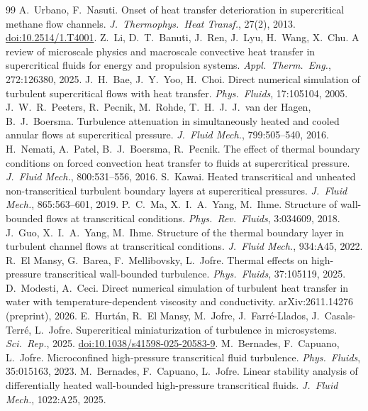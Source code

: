 \documentclass[11pt]{article}
\begin{document}
\begin{thebibliography}{99}
 A.\ Urbano, F.\ Nasuti. Onset of heat transfer deterioration in supercritical methane flow channels. \emph{J.\ Thermophys.\ Heat Transf.}, 27(2), 2013. \href{https://doi.org/10.2514/1.T4001}{doi:10.2514/1.T4001}.
 Z.\ Li, D.\ T.\ Banuti, J.\ Ren, J.\ Lyu, H.\ Wang, X.\ Chu. A review of microscale physics and macroscale convective heat transfer in supercritical fluids for energy and propulsion systems. \emph{Appl.\ Therm.\ Eng.}, 272:126380, 2025.
 J.\ H.\ Bae, J.\ Y.\ Yoo, H.\ Choi. Direct numerical simulation of turbulent supercritical flows with heat transfer. \emph{Phys.\ Fluids}, 17:105104, 2005.
 J.\ W.\ R.\ Peeters, R.\ Pecnik, M.\ Rohde, T.\ H.\ J.\ J.\ van der Hagen, B.\ J.\ Boersma. Turbulence attenuation in simultaneously heated and cooled annular flows at supercritical pressure. \emph{J.\ Fluid Mech.}, 799:505--540, 2016.
 H.\ Nemati, A.\ Patel, B.\ J.\ Boersma, R.\ Pecnik. The effect of thermal boundary conditions on forced convection heat transfer to fluids at supercritical pressure. \emph{J.\ Fluid Mech.}, 800:531--556, 2016.
 S.\ Kawai. Heated transcritical and unheated non-transcritical turbulent boundary layers at supercritical pressures. \emph{J.\ Fluid Mech.}, 865:563--601, 2019.
 P.\ C.\ Ma, X.\ I.\ A.\ Yang, M.\ Ihme. Structure of wall-bounded flows at transcritical conditions. \emph{Phys.\ Rev.\ Fluids}, 3:034609, 2018.
 J.\ Guo, X.\ I.\ A.\ Yang, M.\ Ihme. Structure of the thermal boundary layer in turbulent channel flows at transcritical conditions. \emph{J.\ Fluid Mech.}, 934:A45, 2022.
 R.\ El Mansy, G.\ Barea, F.\ Mellibovsky, L.\ Jofre. Thermal effects on high-pressure transcritical wall-bounded turbulence. \emph{Phys.\ Fluids}, 37:105119, 2025.
 D.\ Modesti, A.\ Ceci. Direct numerical simulation of turbulent heat transfer in water with temperature-dependent viscosity and conductivity. arXiv:2611.14276 (preprint), 2026.
 E.\ Hurt\'an, R.\ El Mansy, M.\ Jofre, J.\ Farr\'e-Llados, J.\ Casals-Terr\'e, L.\ Jofre. Supercritical miniaturization of turbulence in microsystems. \emph{Sci.\ Rep.}, 2025. \href{https://doi.org/10.1038/s41598-025-20583-9}{doi:10.1038/s41598-025-20583-9}.
 M.\ Bernades, F.\ Capuano, L.\ Jofre. Microconfined high-pressure transcritical fluid turbulence. \emph{Phys.\ Fluids}, 35:015163, 2023.
 M.\ Bernades, F.\ Capuano, L.\ Jofre. Linear stability analysis of differentially heated wall-bounded high-pressure transcritical fluids. \emph{J.\ Fluid Mech.}, 1022:A25, 2025.

\end{thebibliography}
\end{document}
